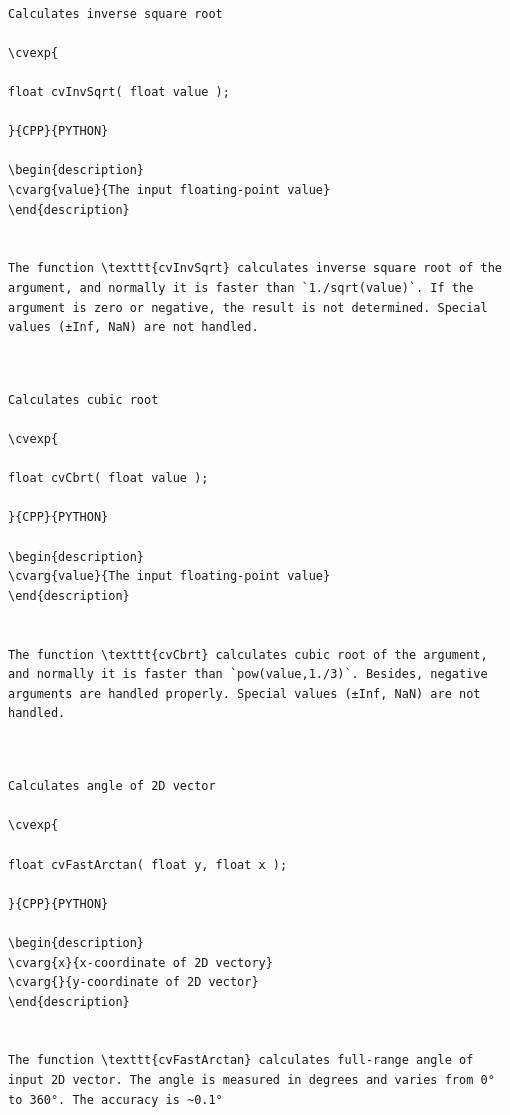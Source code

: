 \begin{verbatim}

Calculates inverse square root

\cvexp{

float cvInvSqrt( float value );

}{CPP}{PYTHON}

\begin{description}
\cvarg{value}{The input floating-point value}
\end{description}


The function \texttt{cvInvSqrt} calculates inverse square root of the argument, and normally it is faster than `1./sqrt(value)`. If the argument is zero or negative, the result is not determined. Special values (±Inf, NaN) are not handled.


\end{verbatim}
\label{Cbrt}
\begin{verbatim}

Calculates cubic root

\cvexp{

float cvCbrt( float value );

}{CPP}{PYTHON}

\begin{description}
\cvarg{value}{The input floating-point value}
\end{description}


The function \texttt{cvCbrt} calculates cubic root of the argument, and normally it is faster than `pow(value,1./3)`. Besides, negative arguments are handled properly. Special values (±Inf, NaN) are not handled.


\end{verbatim}
\label{FastArctan}
\begin{verbatim}

Calculates angle of 2D vector

\cvexp{

float cvFastArctan( float y, float x );

}{CPP}{PYTHON}

\begin{description}
\cvarg{x}{x-coordinate of 2D vectory}
\cvarg{}{y-coordinate of 2D vector}
\end{description}


The function \texttt{cvFastArctan} calculates full-range angle of input 2D vector. The angle is measured in degrees and varies from 0° to 360°. The accuracy is ~0.1°


\end{verbatim}
